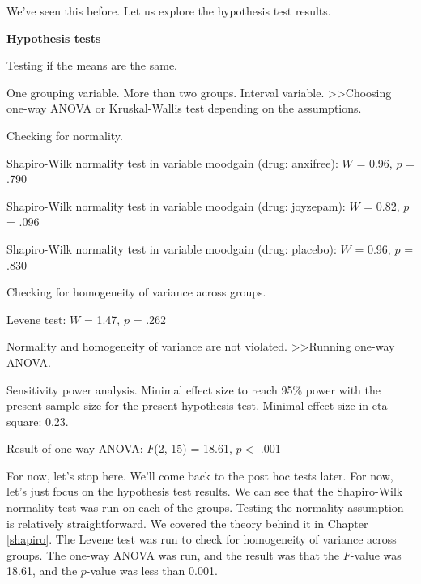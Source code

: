 \documentclass[
  11pt,
  a4paper,
  twoside,symmetric,openright]{book}
\theoremstyle{break}
\theoremstyle{break}
\begin{document}
We've seen this before. Let us explore the hypothesis test results.

\begin{tcolorbox}[colback=white,
  colframe=lightgray,
  coltext=black,
  boxsep=4pt,
  boxrule=0.3pt,
  arc=0pt]
  {   \sffamily
      \color{CSblue}\textbf{Hypothesis tests}
      
      \color{CSgreen}Testing if the means are the same.
      
      One grouping variable. More than two groups. Interval variable.  \textgreater\textgreater  Choosing one-way ANOVA or Kruskal-Wallis test depending on the assumptions.

      Checking for normality.

      \color{black}
      Shapiro-Wilk normality test in variable mood\textunderscore gain (drug: anxifree): $W$ = 0.96, $p$ = .790

      Shapiro-Wilk normality test in variable mood\textunderscore gain (drug: joyzepam): $W$ = 0.82, $p$ = .096

      Shapiro-Wilk normality test in variable mood\textunderscore gain (drug: placebo): $W$ = 0.96, $p$ = .830

      \color{CSgreen}
      Checking for homogeneity of variance across groups.

      \color{black}
      Levene test: $W$ = 1.47, $p$ = .262

      \color{CSgreen}
      Normality and homogeneity of variance are not violated. \textgreater\textgreater Running one-way ANOVA.

      \color{black}
      Sensitivity power analysis. Minimal effect size to reach 95\% power with the present sample size for the present hypothesis test. Minimal effect size in eta-square: 0.23.

      Result of one-way ANOVA: $F$(2, 15) = 18.61, $p <$ .001
      \normalfont
  }
\end{tcolorbox}

For now, let's stop here. We'll come back to the post hoc tests later. For now, let's just focus on the hypothesis test results. We can see that the Shapiro-Wilk normality test was run on each of the groups. Testing the normality assumption is relatively straightforward. We covered the theory behind it in Chapter \ref{shapiro}. The Levene test was run to check for homogeneity of variance across groups. The one-way ANOVA was run, and the result was that the \(F\)-value was 18.61, and the \(p\)-value was less than 0.001.
\end{document}
